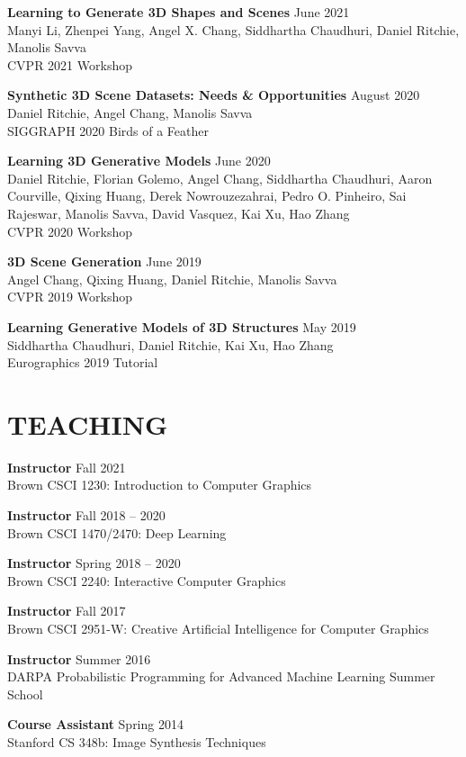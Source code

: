 \documentclass[line,margin]{res}
\begin{document}
\begin{resume}
\newcommand{\tutorial}[4] {
	\textbf{#1} \hfill #4\\
	#2\\
	#3
}
\newcommand{\workshop}[4] {
	\textbf{#1} \hfill #4\\
	#2\\
	#3
}

\workshop
{Learning to Generate 3D Shapes and Scenes}
{Manyi Li, Zhenpei Yang, Angel X. Chang, Siddhartha Chaudhuri, Daniel Ritchie, Manolis Savva}
{CVPR 2021 Workshop}
{June 2021}

\workshop
{Synthetic 3D Scene Datasets: Needs \& Opportunities}
{Daniel Ritchie, Angel Chang, Manolis Savva}
{SIGGRAPH 2020 Birds of a Feather}
{August 2020}

\workshop
{Learning 3D Generative Models}
{Daniel Ritchie, Florian Golemo, Angel Chang, Siddhartha Chaudhuri, Aaron Courville, Qixing Huang, Derek Nowrouzezahrai, Pedro O. Pinheiro, Sai Rajeswar, Manolis Savva, David Vasquez, Kai Xu, Hao Zhang}
{CVPR 2020 Workshop}
{June 2020}

\workshop
{3D Scene Generation}
{Angel Chang, Qixing Huang, Daniel Ritchie, Manolis Savva}
{CVPR 2019 Workshop}
{June 2019}

\tutorial
{Learning Generative Models of 3D Structures}
{Siddhartha Chaudhuri, Daniel Ritchie, Kai Xu, Hao Zhang}
{Eurographics 2019 Tutorial}
{May 2019}


\section{TEACHING}

\newcommand{\teach}[3] {
	\textbf{#1} \hfill #3\\
	#2
}

\teach
{Instructor}
{Brown CSCI 1230: Introduction to Computer Graphics}
{Fall 2021}

\teach
{Instructor}
{Brown CSCI 1470/2470: Deep Learning}
{Fall 2018 -- 2020}

\teach
{Instructor}
{Brown CSCI 2240: Interactive Computer Graphics}
{Spring 2018 -- 2020}

\teach
{Instructor}
{Brown CSCI 2951-W: Creative Artificial Intelligence for Computer Graphics}
{Fall 2017}

\teach
{Instructor}
{DARPA Probabilistic Programming for Advanced Machine Learning Summer School}
{Summer 2016}

\teach
{Course Assistant}
{Stanford CS 348b: Image Synthesis Techniques}
{Spring 2014}


\end{resume}
\end{document}
